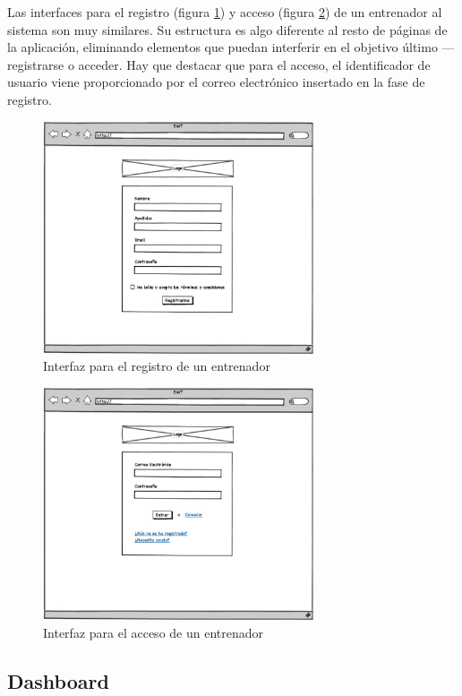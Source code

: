   		Las interfaces para el registro (figura \ref{fig:interfaz_registro}) y acceso (figura \ref{fig:interfaz_acceso}) de un entrenador al sistema son muy similares. Su estructura es algo diferente al resto de páginas de la aplicación, eliminando elementos que puedan interferir en el objetivo último ---registrarse o acceder. Hay que destacar que para el acceso, el identificador de usuario viene proporcionado por el correo electrónico insertado en la fase de registro.

  		\begin{figure}[H]
  		  \centering
  		    \includegraphics[width=8cm]{./eps/p_interfaz/4_Registro.eps}
  		  \caption{Interfaz para el registro de un entrenador}
  		  \label{fig:interfaz_registro}
  		\end{figure}

  		\begin{figure}[H]
  		  \centering
  		    \includegraphics[width=8cm]{./eps/p_interfaz/5_Acceder.eps}
  		  \caption{Interfaz para el acceso de un entrenador}
  		  \label{fig:interfaz_acceso}
  		\end{figure}

  	\subsection{Dashboard} %
  		\label{sub:interfaz_dashboard}


